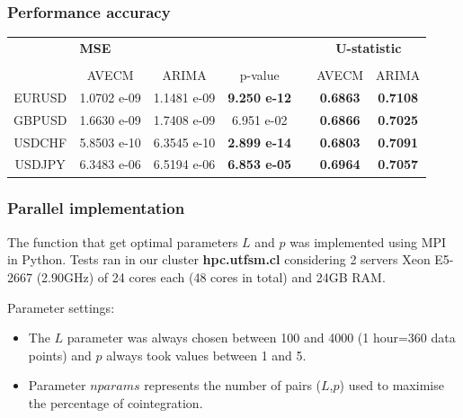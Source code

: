 \documentclass{beamer}
\begin{document}
\begin{frame}
\frametitle{Performance accuracy}
\small
\begin{tabular}{ccccccc}
& \multicolumn{3}{l}{{\bf MSE}} & &
\multicolumn{2}{c}{{\bf $\mathbf{U}$-statistic}} \\ 
\hhline{~---~--} \\
 & AVECM & ARIMA & p-value & &
AVECM & ARIMA \\ 

\hline
 EURUSD & 1.0702 e-09 & 1.1481 e-09 &  \bf{9.250 e-12} & & {\color{GreenTOL}\bf{0.6863}} & {\color{red}\bf{0.7108}}\\
 GBPUSD & 1.6630 e-09 & 1.7408 e-09 &  6.951 e-02 & & {\color{GreenTOL}\bf{0.6866}} & {\color{red}\bf{0.7025}}\\
 USDCHF & 5.8503 e-10 & 6.3545 e-10 &  \bf{2.899 e-14} & & {\color{GreenTOL}\bf{0.6803}} & {\color{red}\bf{0.7091}}\\
 USDJPY  & 6.3483 e-06 & 6.5194 e-06 &  \bf{6.853 e-05} & & {\color{GreenTOL}\bf{0.6964}} & {\color{red}\bf{0.7057}}
 \end{tabular}
 \end{frame}
%
%
%
\begin{frame}
\frametitle{Parallel implementation}
The function that get optimal parameters $L$ and $p$ was implemented using MPI in Python. Tests ran in our cluster {\bf hpc.utfsm.cl} considering 2 servers Xeon E5-2667 (2.90GHz) of 24 cores each (48 cores in total) and 24GB RAM.

Parameter settings:
\begin{itemize}
\item The $L$ parameter was always chosen between 100 and 4000 (1 hour=360 data points) and $p$ always took values between 1 and 5. 
\item Parameter $nparams$ represents the number of pairs ($L$,$p$) used to maximise the percentage of cointegration. 
\end{itemize}
\end{frame}
\end{document}

